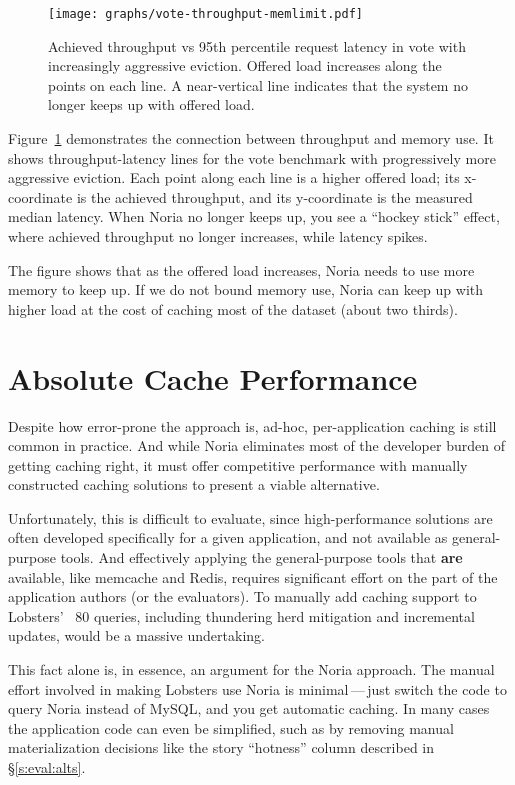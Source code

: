 \begin{figure}[h]
  \centering
  \texttt{[image: graphs/vote-throughput-memlimit.pdf]}
  \caption{Achieved throughput vs 95th percentile request latency in vote with
  increasingly aggressive eviction. Offered load increases along the points on
  each line. A near-vertical line indicates that the system no longer keeps up
  with offered load.}
  \label{f:vote-throughput-memlimit}
\end{figure}

Figure~\ref{f:vote-throughput-memlimit} demonstrates the connection between
throughput and memory use. It shows throughput-latency lines for the vote
benchmark with progressively more aggressive eviction. Each point along each
line is a higher offered load; its x-coordinate is the achieved throughput, and
its y-coordinate is the measured median latency. When Noria no longer keeps up,
you see a ``hockey stick'' effect, where achieved throughput no longer
increases, while latency spikes.

The figure shows that as the offered load increases, Noria needs to use more
memory to keep up. If we do not bound memory use, Noria can keep up with higher
load at the cost of caching most of the dataset (about two thirds).

\section{Absolute Cache Performance}
\label{s:eval:kvperf}

Despite how error-prone the approach is, ad-hoc, per-application caching is
still common in practice. And while Noria eliminates most of the developer
burden of getting caching right, it must offer competitive performance with
manually constructed caching solutions to present a viable alternative.

Unfortunately, this is difficult to evaluate, since high-performance solutions
are often developed specifically for a given application, and not available as
general-purpose tools. And effectively applying the general-purpose tools that
\textbf{are} available, like memcache and Redis, requires significant effort on
the part of the application authors (or the evaluators). To manually add caching
support to Lobsters' ~80 queries, including thundering herd mitigation and
incremental updates, would be a massive undertaking.

This fact alone is, in essence, an argument for the Noria approach. The manual
effort involved in making Lobsters use Noria is minimal\,---\,just switch the
code to query Noria instead of MySQL, and you get automatic caching. In many
cases the application code can even be simplified, such as by removing manual
materialization decisions like the story ``hotness'' column described in
\S\ref{s:eval:alts}.

